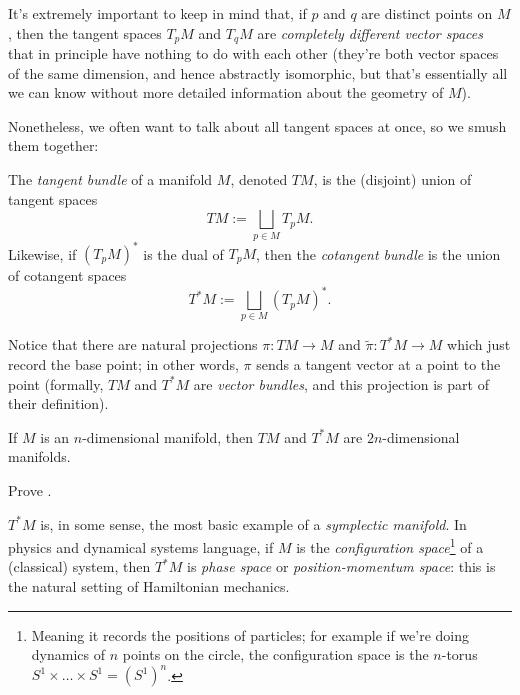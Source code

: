 
It's extremely important to keep in mind that, if $p$ and $q$ are distinct points on $M$, then the tangent spaces $T_pM$ and $T_qM$ are \emph{completely different vector spaces} that in principle have nothing to do with each other (they're both vector spaces of the same dimension, and hence abstractly isomorphic, but that's essentially all we can know without more detailed information about the geometry of $M$).

Nonetheless, we often want to talk about all tangent spaces at once, so we smush them together:

\begin{definition}\label{def:tangent bundle}
	The \emph{tangent bundle} of a manifold $M$, denoted $TM$, is the (disjoint) union of tangent spaces
	\[
		TM := \bigsqcup_{p \in M} T_p M.
	\]
	Likewise, if $(T_pM)^\ast$ is the dual of $T_pM$, then the \emph{cotangent bundle} is the union of cotangent spaces
	\[
		T^\ast M := \bigsqcup_{p \in M} (T_pM)^\ast.
	\]
\end{definition}

Notice that there are natural projections $\pi: TM \to M$ and $\widetilde{\pi}: T^\ast M \to M$ which just record the base point; in other words, $\pi$ sends a tangent vector at a point to the point (formally, $TM$ and $T^\ast M$ are \emph{vector bundles}, and this projection is part of their definition).

\begin{theorem}\label{thm:tangent bundles are manifolds}
	If $M$ is an $n$-dimensional manifold, then $TM$ and $T^\ast M$ are $2n$-dimensional manifolds.
\end{theorem}

\begin{exercise}
	Prove .
\end{exercise}

$T^\ast M$ is, in some sense, the most basic example of a \emph{symplectic manifold}. In physics and dynamical systems language, if $M$ is the \emph{configuration space}\footnote{Meaning it records the positions of particles; for example if we're doing dynamics of $n$ points on the circle, the configuration space is the $n$-torus $S^1 \times \dots \times S^1 = (S^1)^n$.} of a (classical) system, then $T^\ast M$ is \emph{phase space} or \emph{position-momentum space}: this is the natural setting of Hamiltonian mechanics.


